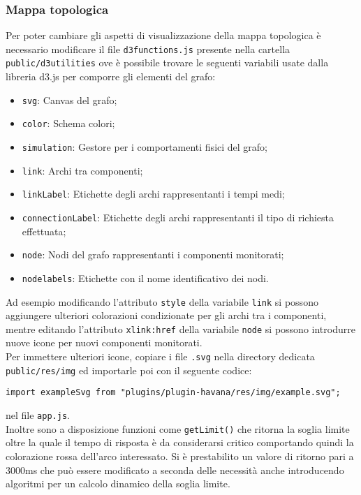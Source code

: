 \subsubsection{Mappa topologica}
\label{sec:graph}
Per poter cambiare gli aspetti di visualizzazione della mappa topologica è necessario modificare il file \texttt{d3functions.js} presente nella cartella \texttt{public/d3utilities} ove è possibile trovare le seguenti variabili usate dalla libreria d3.js per comporre gli elementi del grafo:
\begin{itemize}
	\item \texttt{svg}: Canvas del grafo;
	\item \texttt{color}: Schema colori;
	\item \texttt{simulation}: Gestore per i comportamenti fisici del grafo;
	\item \texttt{link}: Archi tra componenti;
	\item \texttt{linkLabel}: Etichette degli archi rappresentanti i tempi medi;
	\item \texttt{connectionLabel}: Etichette degli archi rappresentanti il tipo di richiesta effettuata;
	\item \texttt{node}: Nodi del grafo rappresentanti i componenti monitorati;
	\item \texttt{nodelabels}: Etichette con il nome identificativo dei nodi.
\end{itemize}
Ad esempio modificando l'attributo \texttt{style} della variabile \texttt{link} si possono aggiungere ulteriori colorazioni condizionate per gli archi tra i componenti, mentre editando l'attributo \texttt{xlink:href} della variabile \texttt{node} si possono introdurre nuove icone per nuovi componenti monitorati. \\
Per immettere ulteriori icone, copiare i file \texttt{.svg} nella directory dedicata \texttt{public/res/img} ed importarle poi con il seguente codice:
\begin{lstlisting}
import exampleSvg from "plugins/plugin-havana/res/img/example.svg";
\end{lstlisting}
nel file \texttt{app.js}.\\
Inoltre sono a disposizione funzioni come \texttt{getLimit()} che ritorna la soglia limite oltre la quale il tempo di risposta è da considerarsi critico comportando quindi la colorazione rossa dell'arco interessato. 
Si è prestabilito un valore di ritorno pari a 3000ms che può essere modificato a seconda delle necessità anche introducendo algoritmi per un calcolo dinamico della soglia limite. \\
